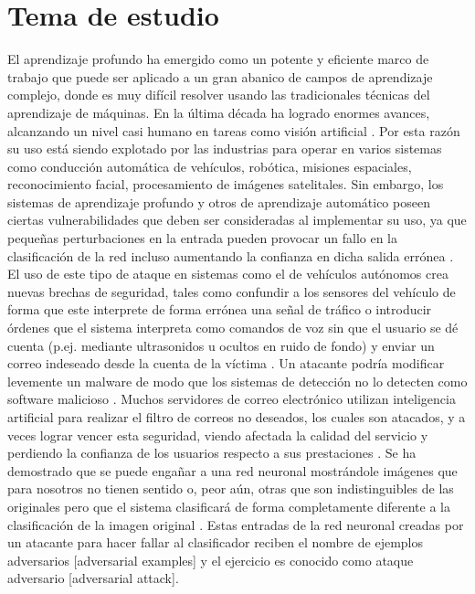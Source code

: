 \section{Tema de estudio}
El aprendizaje profundo ha emergido como un potente y eficiente marco de trabajo que puede ser aplicado a un gran abanico de campos de aprendizaje complejo, donde es muy difícil resolver usando las tradicionales técnicas del aprendizaje de máquinas. En la última década ha logrado enormes avances, alcanzando un nivel casi humano en tareas como visión artificial \parencite{r30}. Por esta razón su uso está siendo explotado por las industrias para operar en varios sistemas como conducción automática de vehículos, robótica, misiones espaciales, reconocimiento facial, procesamiento de imágenes satelitales. Sin embargo, los sistemas de aprendizaje profundo y otros de aprendizaje automático poseen ciertas vulnerabilidades que deben ser consideradas al implementar su uso, ya que pequeñas perturbaciones en la entrada pueden provocar un fallo en la clasificación de la red incluso aumentando la confianza en dicha salida errónea \parencite{r49,r4,r3}. El uso de este tipo de ataque en sistemas como el de vehículos autónomos crea nuevas brechas de seguridad, tales como confundir a los sensores del vehículo de forma que este interprete de forma errónea una señal de tráfico \parencite{r37,r47} o introducir órdenes que el sistema interpreta como comandos de voz sin que el usuario se dé cuenta (p.ej. mediante ultrasonidos u ocultos en ruido de fondo) y enviar un correo indeseado desde la cuenta de la víctima \parencite{r14}. Un atacante podría modificar levemente un malware de modo que los sistemas de detección no lo detecten como software malicioso \parencite{r45}. Muchos servidores de correo electrónico utilizan inteligencia artificial para realizar el filtro de correos no deseados, los cuales son atacados, y a veces lograr vencer esta seguridad, viendo afectada la calidad del servicio y perdiendo la confianza de los usuarios respecto a sus prestaciones \parencite{r46}.
Se ha demostrado que se puede engañar a una red neuronal mostrándole imágenes que para nosotros no tienen sentido o, peor aún, otras que son indistinguibles de las originales pero que el sistema clasificará de forma completamente diferente a la clasificación de la imagen original \parencite{r4}. Estas entradas de la red neuronal creadas por un atacante para hacer fallar al clasificador reciben el nombre de ejemplos adversarios [adversarial examples] y el ejercicio es conocido como ataque adversario [adversarial attack].

